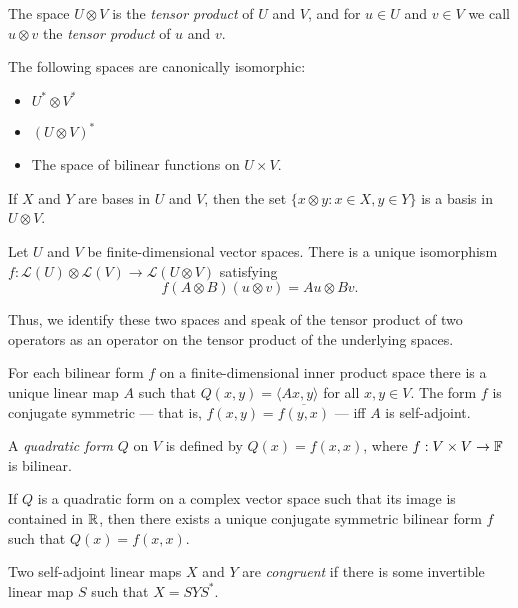 \begin{defn}
    The space $U\otimes V$ is the \emph{tensor product} of $U$ and $V$, and for
    $u\in U$ and $v\in V$ we call $u\otimes v$ the \emph{tensor product} of $u$
    and $v$.
\end{defn}
\begin{prop}
    The following spaces are canonically isomorphic:
    \begin{itemize}
        \item $U^*\otimes V^*$
        \item $(U\otimes V)^*$
        \item The space of bilinear functions on $U\times V$.
    \end{itemize}
\end{prop}
\begin{prop}
    If $X$ and $Y$ are bases in $U$ and $V$, then the set $\{x\otimes y:x\in
    X,y\in Y\}$ is a basis in $U\otimes V$.
\end{prop}
\begin{prop}
    Let $U$ and $V$ be finite-dimensional vector spaces.
    There is a unique isomorphism $f:\mathcal
    L(U)\otimes\mathcal L(V)\to\mathcal L(U\otimes V)$ satisfying
    \[f(A\otimes B)(u\otimes v)=Au\otimes Bv.\]
\end{prop}
\begin{defn}
    Thus, we identify these two spaces and speak of the tensor product of
    two operators as an operator on the tensor product of the underlying spaces.
\end{defn}
\begin{prop}
  For each bilinear form $f$ on a finite-dimensional inner product space
  there is a unique linear map $A$
  such that $Q(x,y)=\langle Ax,y\rangle$ for all $x,y\in V$. The form $f$ is
  conjugate symmetric --- that is, $f(x,y)=\overline{f(y,x)}$ --- iff $A$ is
  self-adjoint.
\end{prop}
\begin{defn}
  A \emph{quadratic form} $Q$ on $V$ is defined by $Q(x)=f(x,x)$, where
  $f:V\times V\to\mathbb{F}$ is bilinear.
\end{defn}
\begin{prop}
  If $Q$ is a quadratic form on a complex vector space such that its image is
  contained in $\mathbb{R}$, then there exists a unique conjugate symmetric bilinear
  form $f$ such that $Q(x)=f(x,x)$.
\end{prop}
\begin{defn}
  Two self-adjoint linear maps $X$ and $Y$ are \emph{congruent} if there is some
  invertible linear map $S$ such that $X=SYS^*$.
\end{defn}
